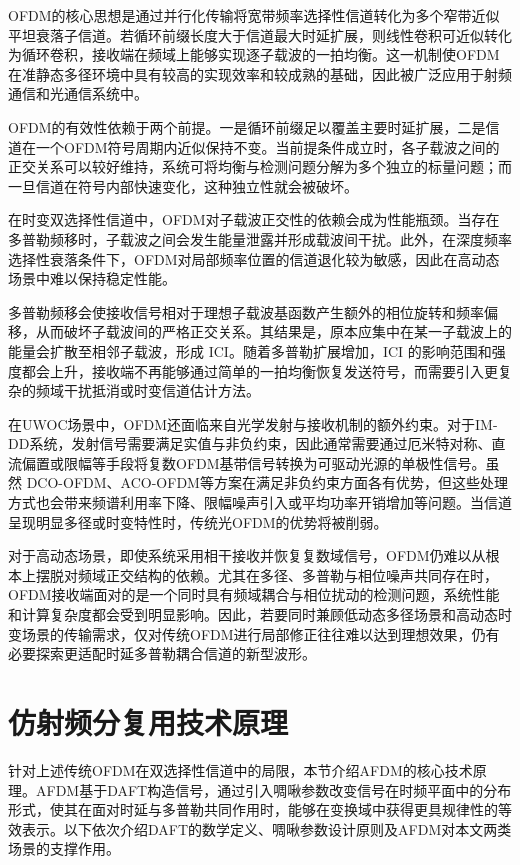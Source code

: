 OFDM的核心思想是通过并行化传输将宽带频率选择性信道转化为多个窄带近似平坦衰落子信道。若循环前缀长度大于信道最大时延扩展，则线性卷积可近似转化为循环卷积，接收端在频域上能够实现逐子载波的一拍均衡。这一机制使OFDM在准静态多径环境中具有较高的实现效率和较成熟的基础，因此被广泛应用于射频通信和光通信系统中。

OFDM的有效性依赖于两个前提。一是循环前缀足以覆盖主要时延扩展，二是信道在一个OFDM符号周期内近似保持不变。当前提条件成立时，各子载波之间的正交关系可以较好维持，系统可将均衡与检测问题分解为多个独立的标量问题；而一旦信道在符号内部快速变化，这种独立性就会被破坏。

在时变双选择性信道中，OFDM对子载波正交性的依赖会成为性能瓶颈。当存在多普勒频移时，子载波之间会发生能量泄露并形成载波间干扰\cite{zhuDopplerResistantOrthogonalChirp2022}。此外，在深度频率选择性衰落条件下，OFDM对局部频率位置的信道退化较为敏感，因此在高动态场景中难以保持稳定性能。

多普勒频移会使接收信号相对于理想子载波基函数产生额外的相位旋转和频率偏移，从而破坏子载波间的严格正交关系。其结果是，原本应集中在某一子载波上的能量会扩散至相邻子载波，形成 ICI。随着多普勒扩展增加，ICI 的影响范围和强度都会上升，接收端不再能够通过简单的一拍均衡恢复发送符号，而需要引入更复杂的频域干扰抵消或时变信道估计方法。

在UWOC场景中，OFDM还面临来自光学发射与接收机制的额外约束。对于IM-DD系统，发射信号需要满足实值与非负约束，因此通常需要通过厄米特对称、直流偏置或限幅等手段将复数OFDM基带信号转换为可驱动光源的单极性信号。虽然 DCO-OFDM、ACO-OFDM等方案在满足非负约束方面各有优势，但这些处理方式也会带来频谱利用率下降、限幅噪声引入或平均功率开销增加等问题。当信道呈现明显多径或时变特性时，传统光OFDM的优势将被削弱。

对于高动态场景，即使系统采用相干接收并恢复复数域信号，OFDM仍难以从根本上摆脱对频域正交结构的依赖。尤其在多径、多普勒与相位噪声共同存在时，OFDM接收端面对的是一个同时具有频域耦合与相位扰动的检测问题，系统性能和计算复杂度都会受到明显影响。因此，若要同时兼顾低动态多径场景和高动态时变场景的传输需求，仅对传统OFDM进行局部修正往往难以达到理想效果，仍有必要探索更适配时延多普勒耦合信道的新型波形。

\section{仿射频分复用技术原理}
\label{sec:afdm_theory}

针对上述传统OFDM在双选择性信道中的局限，本节介绍AFDM的核心技术原理。AFDM基于DAFT构造信号，通过引入啁啾参数改变信号在时频平面中的分布形式，使其在面对时延与多普勒共同作用时，能够在变换域中获得更具规律性的等效表示\cite{bemaniAFDMFullDiversity2021}。以下依次介绍DAFT的数学定义、啁啾参数设计原则及AFDM对本文两类场景的支撑作用。

